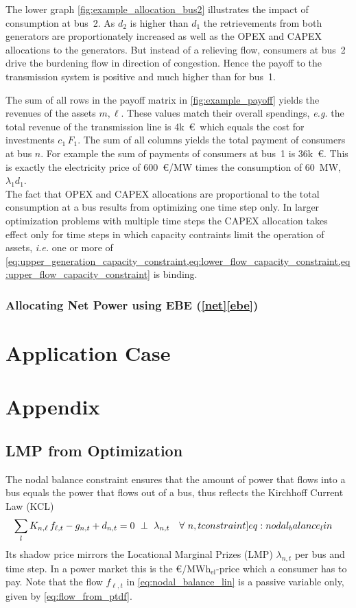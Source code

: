 \documentclass[11pt,twocolumn]{article}
\newcommand{\ie}{\textit{i.e.} }
\newcommand{\resultsin}[1]{\hspace{6pt} \bot  \hspace{6pt} #1}
\newcommand{\Forall}[1]{\hspace{10pt} \forall \,\, #1 }
\newcommand{\nodalgeneration}[1][n]{g_{#1,t}}
\newcommand{\nodaldemand}[1][n]{d_{#1,t}}
\newcommand{\incidence}[1][n]{K_{#1,\ell}}
\newcommand{\lmp}[1][n]{\lambda_{#1,t}}
\newcommand{\flow}{f_{\ell,t}}
\newcommand{\megawatthour}{MWh$_\text{el}$}
\begin{document}
The lower graph \cref{fig:example_allocation_bus2} illustrates the impact of consumption at bus~2. As $d_2$ is higher than $d_1$ the retrievements from both generators are proportionately increased as well as the OPEX and CAPEX allocations to the generators. But instead of a relieving flow, consumers at bus~2 drive the burdening flow in direction of congestion. Hence the payoff to the transmission system is positive and much higher than for bus~1.

The sum of all rows in the payoff matrix in \cref{fig:example_payoff} yields the revenues of the assets $m, \ell$. These values match their overall spendings, \textit{e.g.} the total revenue of the transmission line is 4k~\euro\, which equals the cost for investments $c_{1}\,F_{1}$. The sum of all columns yields the total payment of consumers at bus $n$. For example the sum of payments of consumers at bus~1 is 36k~\euro. This is exactly the electricity price of 600~\euro/MW times the consumption of 60~MW, $\lambda_1 d_1$. \\

The fact that OPEX and CAPEX allocations are proportional to the total consumption at a bus results from optimizing one time step only. In larger optimization problems with multiple time steps the CAPEX allocation takes effect only for time steps in which capacity contraints limit the operation of assets, \ie one or more of  \cref{eq:upper_generation_capacity_constraint,eq:lower_flow_capacity_constraint,eq:upper_flow_capacity_constraint} is binding.  

\subsubsection*{Allocating Net Power using EBE (\ref{net}\ref{ebe}) }




\section{Application Case}


\clearpage
\appendix

\section{Appendix}
\subsection{LMP from Optimization}
The nodal balance constraint ensures that the amount of power that flows into a bus equals the power that flows out of a bus, thus reflects the Kirchhoff Current Law (KCL)
\begin{align}
    \sum_l \incidence \, \flow  - \nodalgeneration + \nodaldemand &= 0 \resultsin{\lmp} \Forall{n,t}
    \label[constraint]{eq:nodal_balance_lin}
\end{align}
Its shadow price mirrors the Locational Marginal Prizes (LMP) $\lmp$ per bus and time step. In a power market this is the \euro/\megawatthour-price which a consumer has to pay. Note that the flow $\flow$ in \cref{eq:nodal_balance_lin} is a passive variable only, given by \cref{eq:flow_from_ptdf}.\\
\end{document}
